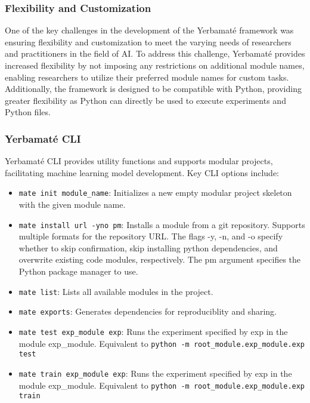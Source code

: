 \subsubsection{Flexibility and Customization}

One of the key challenges in the development of the Yerbamaté framework was ensuring flexibility and customization to meet the varying needs of researchers and practitioners in the field of AI. To address this challenge, Yerbamaté provides increased flexibility by not imposing any restrictions on additional module names, enabling researchers to utilize their preferred module names for custom tasks. 
Additionally, the framework is designed to be compatible with Python, providing greater flexibility as Python can directly be used to execute experiments and Python files.


\subsubsection{Yerbamaté CLI}
Yerbamaté CLI provides utility functions and supports modular projects, facilitating machine learning model development. Key CLI options include:

\begin{itemize}
\item \texttt{mate init module\_name}: Initializes a new empty modular project skeleton with the given module name. 

\item \texttt{mate install url -y\textbar n\textbar o pm}: Installs a module from a git repository. Supports multiple formats for the repository URL. The flags -y, -n, and -o specify whether to skip confirmation, skip installing python dependencies, and overwrite existing code modules, respectively. The pm argument specifies the Python package manager to use.
\item \texttt{mate list}: Lists all available modules in the project. 
\item \texttt{mate exports}: Generates dependencies for reproduciblity and sharing.
\item \texttt{mate test exp\_module exp}: Runs the experiment specified by exp in the module exp\_module. Equivalent to \texttt{python -m root\_module.exp\_module.exp test}
\item \texttt{mate train exp\_module exp}: Runs the experiment specified by exp in the module exp\_module. Equivalent to \texttt{python -m root\_module.exp\_module.exp train}
\end{itemize}


